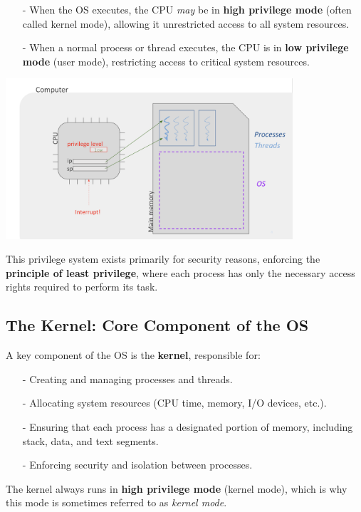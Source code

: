 \documentclass[../../compsys.tex]{subfiles}
\begin{document}
\begin{itemize}
  \item[-] When the OS executes, the CPU \textit{may} be in \textbf{high privilege mode} (often called kernel mode), allowing it unrestricted access to all system resources.
\item[-] When a normal process or thread executes, the CPU is in \textbf{low privilege mode} (user mode), restricting access to critical system resources.
\end{itemize}

\begin{center}
  \includegraphics[width=0.8\textwidth]{chapters/L3/images/priviledge.png}
\end{center}

This privilege system exists primarily for security reasons, enforcing the \textbf{principle of least privilege}, where each process has only the necessary access rights required to perform its task. 

\subsection{The Kernel: Core Component of the OS}

A key component of the OS is the \textbf{kernel}, responsible for:

\begin{itemize}
  \item[-] Creating and managing processes and threads.
  \item[-] Allocating system resources (CPU time, memory, I/O devices, etc.).
  \item[-] Ensuring that each process has a designated portion of memory, including stack, data, and text segments.
  \item[-] Enforcing security and isolation between processes.
\end{itemize}

The kernel always runs in \textbf{high privilege mode} (kernel mode), which is why this mode is sometimes referred to as \textit{kernel mode}. 
\end{document}
